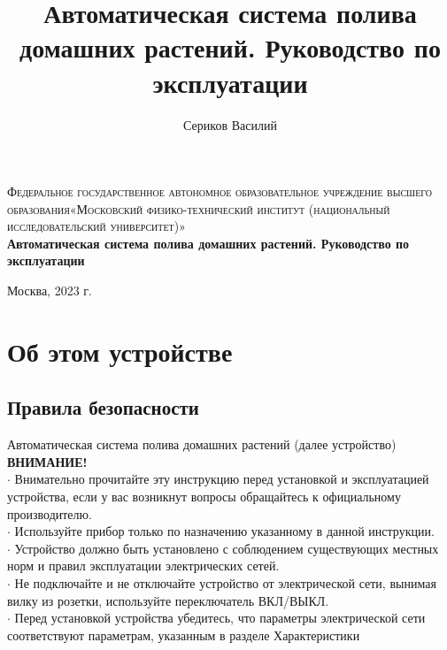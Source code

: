 \documentclass[12pt]{article}
\title{Автоматическая система полива домашних растений. Руководство по эксплуатации}
\author{Сериков Василий}
\begin{document}
	\begin{titlepage}
		\begin{center}
			\textsc{Федеральное государственное автономное образовательное учреждение высшего образования«Московский физико-технический институт (национальный исследовательский университет)»\\[5mm]
			}
			\vfill
			\textbf{Автоматическая система полива домашних растений. Руководство по эксплуатации}
			
		\end{center}
	
	\vfill
	\begin{center}
		Москва, 2023 г.
	\end{center}
	\end{titlepage}
	
	\tableofcontents
	
	\clearpage
	\newpage
	
	\section{Об этом устройстве}
	\subsection{Правила безопасности}
	
	Автоматическая система полива домашних растений (далее устройство)\\
	
	\textbf{ВНИМАНИЕ!}\\
	
	$\cdot$ Внимательно прочитайте эту инструкцию перед установкой и эксплуатацией устройства, если у вас возникнут вопросы обращайтесь
	к официальному производителю. \\
	
	$\cdot$ Используйте прибор только по назначению
	указанному в данной инструкции.\\
	
	$\cdot$ Устройство должно быть установлено с соблюдением
	существующих местных норм и правил эксплуатации
	электрических сетей.\\
	
	$\cdot$ Не подключайте и не отключайте устройство
	от электрической сети, вынимая вилку из розетки, используйте переключатель ВКЛ/ВЫКЛ.\\
	
	$\cdot$ Перед установкой устройства убедитесь,
	что параметры электрической сети
	соответствуют параметрам, указанным в разделе Характеристики \\
	
\end{document}
